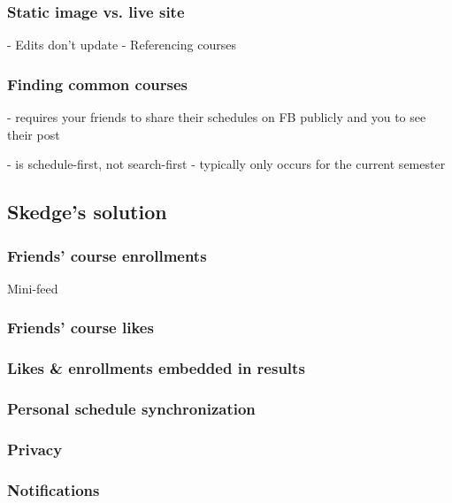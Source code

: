   \subsubsection{Static image vs. live site}

  - Edits don’t update
  - Referencing courses

  \subsubsection{Finding common courses}

  - requires your friends to share their schedules on FB publicly and you to see their post




  - is schedule-first, not search-first
  - typically only occurs for the current semester


\subsection{Skedge's solution}


  \subsubsection{Friends' course enrollments}

  Mini-feed

  \subsubsection{Friends' course likes}

  \subsubsection{Likes \& enrollments embedded in results}

  \subsubsection{Personal schedule synchronization}

  \subsubsection{Privacy}

  \subsubsection{Notifications}

